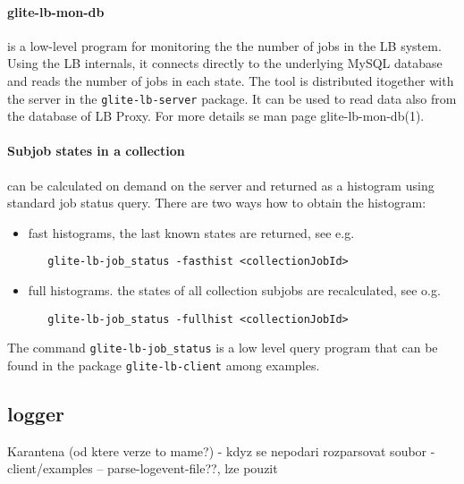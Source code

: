 \paragraph{glite-lb-mon-db} is a low-level program for monitoring the the
number of jobs in the LB system. Using the LB internals, it connects directly
to the underlying MySQL database and reads the number of jobs in each state.
The tool is distributed itogether with the server in the \verb'glite-lb-server' package.
It can be used to read data also from the database of LB Proxy.
For more details se man page glite-lb-mon-db(1).


\paragraph{Subjob states in a collection} can be calculated on demand on the server and
returned as a histogram using standard job status query. There are two ways how to obtain the 
histogram:
\begin{itemize}
\item fast histograms, the last known states are returned, see e.g.
\begin{verbatim}
   glite-lb-job_status -fasthist <collectionJobId>
\end{verbatim}
\item full histograms. the states of all collection subjobs are recalculated, see o.g.
\begin{verbatim}
   glite-lb-job_status -fullhist <collectionJobId>
\end{verbatim}
\end{itemize}
The command \verb'glite-lb-job_status' is a low level query program that can be
found in the package \verb'glite-lb-client' among examples.





\subsection{\LB logger}

\iffalse
{}

Karantena (od ktere verze to mame?)
- kdyz se nepodari rozparsovat soubor
- client/examples -- parse-logevent-file??, lze pouzit


